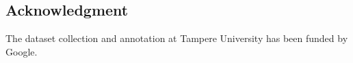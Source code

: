 \documentclass{article}
\begin{document}
\begin{sloppy}
\section{Acknowledgment}
\label{sec:acknowledgment}

The dataset collection and annotation at Tampere University has been funded by Google.







\end{sloppy}
\end{document}
